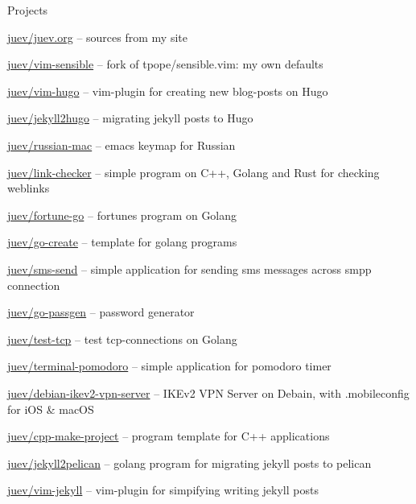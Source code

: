 \documentclass{resume} %
\begin{document}

\begin{rSection}{Projects}

\item{\href{https://github.com/juev/juev.org}{juev/juev.org} -- sources from my site} %
\item{\href{https://github.com/juev/vim-sensible}{juev/vim-sensible} -- fork of tpope/sensible.vim: my own defaults} %
\item{\href{https://github.com/juev/vim-hugo}{juev/vim-hugo} -- vim-plugin for creating new blog-posts on Hugo} %
\item{\href{https://github.com/juev/jekyll2hugo}{juev/jekyll2hugo} -- migrating jekyll posts to Hugo} %
\item{\href{https://github.com/juev/russian-mac}{juev/russian-mac} -- emacs keymap for Russian} %
\item{\href{https://github.com/juev/link-checker}{juev/link-checker} -- simple program on C++, Golang and Rust for checking weblinks} %
\item{\href{https://github.com/juev/fortune-go}{juev/fortune-go} -- fortunes program on Golang} %
\item{\href{https://github.com/juev/go-create}{juev/go-create} -- template for golang programs} %
\item{\href{https://github.com/juev/sms-send}{juev/sms-send} -- simple application for sending sms messages across smpp connection} %
\item{\href{https://github.com/juev/go-passgen}{juev/go-passgen} -- password generator} %
\item{\href{https://github.com/juev/test-tcp}{juev/test-tcp} -- test tcp-connections on Golang} %
\item{\href{https://github.com/juev/terminal-pomodoro}{juev/terminal-pomodoro} -- simple application for pomodoro timer} %
\item{\href{https://github.com/juev/debian-ikev2-vpn-server}{juev/debian-ikev2-vpn-server} -- IKEv2 VPN Server on Debain, with .mobileconfig for iOS \& macOS} %
\item{\href{https://github.com/juev/cpp-make-project}{juev/cpp-make-project} -- program template for C++ applications} %
\item{\href{https://github.com/juev/jekyll2pelican}{juev/jekyll2pelican} -- golang program for migrating jekyll posts to pelican} %
\item{\href{https://github.com/juev/vim-jekyll}{juev/vim-jekyll} -- vim-plugin for simpifying writing jekyll posts} %

\end{rSection}
\end{document}
